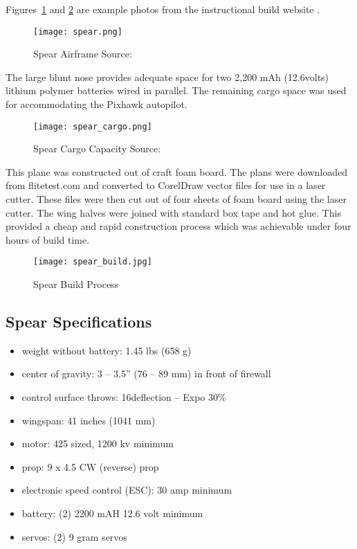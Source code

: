 Figures~\ref{fig:spear} and \ref{fig:spear_cargo} are example photos from the instructional build website \cite{flitetest}.

\begin{figure}[!h]
 \centering
  \texttt{[image: spear.png]}
  \caption{Spear Airframe Source:\cite{flitetest}}
  \label{fig:spear}
\end{figure}

The large blunt nose provides adequate space for two 2,200 mAh (12.6volts) lithium polymer batteries wired in parallel.  The remaining cargo space was used for accommodating the Pixhawk autopilot.

\begin{figure}[!h]
 \centering
  \texttt{[image: spear\_cargo.png]}
  \caption{Spear Cargo Capacity Source:\cite{flitetest}}
  \label{fig:spear_cargo}
\end{figure}

This plane was constructed out of craft foam board.  The plans were downloaded from flitetest.com\cite{flitetest} and converted to CorelDraw vector files for use in a laser cutter.  These files were then cut out of four sheets of foam board using the laser cutter.  The wing halves were joined with standard box tape and hot glue.  This provided a cheap and rapid construction process which was achievable under four hours of build time.

\begin{figure}[!h]
 \centering
  \texttt{[image: spear\_build.jpg]}
  \caption{Spear Build Process}
  \label{fig:spear_build}
\end{figure}

\subsection{Spear Specifications}
\begin{itemize}
 \item weight without battery: 1.45 lbs (658 g)
 \item center of gravity: 3 – 3.5” (76 – 89 mm) in front of firewall
 \item control surface throws: 16\degrees  deflection – Expo 30\%
 \item wingspan: 41 inches (1041 mm)
 \item motor: 425 sized, 1200 kv minimum
 \item prop: 9 x 4.5 CW (reverse) prop
 \item electronic speed control (ESC): 30 amp minimum
 \item battery: (2) 2200 mAH 12.6 volt minimum
 \item servos: (2) 9 gram servos 
\end{itemize}

